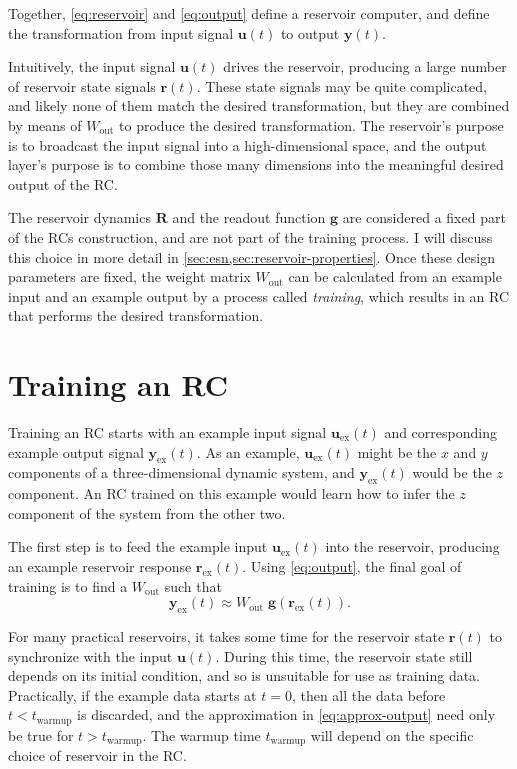 Together, \cref{eq:reservoir} and \cref{eq:output} define a reservoir
computer, and define the transformation from input signal $\bm{u}(t)$
to output $\bm{y}(t)$.

Intuitively, the input signal $\bm{u}(t)$ drives the reservoir,
producing a large number of reservoir state signals $\bm{r}(t)$. These
state signals may be quite complicated, and likely none of them match
the desired transformation, but they are combined by means of
$W_\text{out}$ to produce the desired transformation. The reservoir's
purpose is to broadcast the input signal into a high-dimensional
space, and the output layer's purpose is to combine those many dimensions
into the meaningful desired output of the RC.

The reservoir dynamics $\bm{R}$ and the readout function $\bm{g}$ are
considered a fixed part of the RCs construction, and are not part of
the training process. I will discuss this choice in more detail in
\cref{sec:esn,sec:reservoir-properties}. Once these design parameters
are fixed, the weight matrix $W_\text{out}$ can be calculated from an
example input and an example output by a process called
\emph{training}, which results in an RC that performs the desired
transformation.

\section{Training an RC}\label{sec:training}

Training an RC starts with an example input signal
$\bm{u}_\text{ex}(t)$ and corresponding example output signal
$\bm{y}_\text{ex}(t)$. As an example, $\bm{u}_\text{ex}(t)$ might be
the $x$ and $y$ components of a three-dimensional dynamic system, and
$\bm{y}_\text{ex}(t)$ would be the $z$ component. An RC trained on this
example would learn how to infer the $z$ component of the system from
the other two.

The first step is to feed the example input $\bm{u}_\text{ex}(t)$ into the reservoir, producing an example reservoir response $\bm{r}_\text{ex}(t)$. Using \cref{eq:output}, the final goal of training is to find a $W_\text{out}$ such that
\begin{equation}
  \label{eq:approx-output}
  \mathbf{y}_\text{ex}(t) \approx W_\text{out}\;\mathbf{g}\left(\mathbf{r}_\text{ex}(t)\right).
\end{equation}

For many practical reservoirs, it takes some time for the reservoir
state $\bm{r}(t)$ to synchronize with the input $\bm{u}(t)$. During
this time, the reservoir state still depends on its initial condition,
and so is unsuitable for use as training data. Practically, if the
example data starts at $t = 0$, then all the data before $t <
t_\text{warmup}$ is discarded, and the approximation in
\cref{eq:approx-output} need only be true for $t >
t_\text{warmup}$. The warmup time $t_\text{warmup}$ will depend on the
specific choice of reservoir in the RC.

